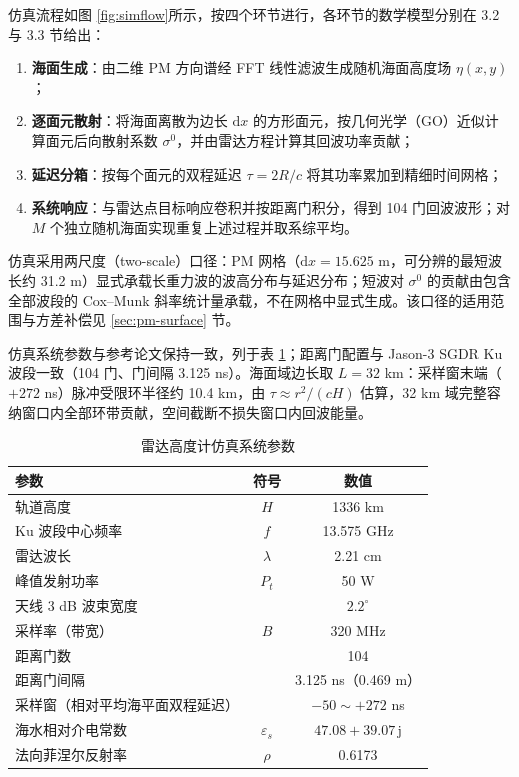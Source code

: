 \documentclass[a4paper]{article}
\newcommand{\song}{\CJKfamily{song}}
\newcommand{\wuhao}{\fontsize{10.5pt}{18pt}\selectfont}
\newcommand{\reffig}[1]{图 \ref{#1}}
\newcommand{\reftab}[1]{表 \ref{#1}}
\begin{document}
仿真流程如\reffig{fig:simflow}所示，按四个环节进行，各环节的数学模型分别在 3.2 与 3.3 节给出：
\begin{enumerate}
	\item \textbf{海面生成}：由二维 PM 方向谱经 FFT 线性滤波生成随机海面高度场 $\eta(x, y)$；
	\item \textbf{逐面元散射}：将海面离散为边长 $\mathrm{d}x$ 的方形面元，按几何光学（GO）近似计算面元后向散射系数 $\sigma^0$，并由雷达方程计算其回波功率贡献；
	\item \textbf{延迟分箱}：按每个面元的双程延迟 $\tau = 2R/c$ 将其功率累加到精细时间网格；
	\item \textbf{系统响应}：与雷达点目标响应卷积并按距离门积分，得到 104 门回波波形；对 $M$ 个独立随机海面实现重复上述过程并取系综平均。
\end{enumerate}

仿真采用两尺度（two-scale）口径：PM 网格（$\mathrm{d}x = 15.625$ m，可分辨的最短波长约 31.2 m）显式承载长重力波的波高分布与延迟分布；短波对 $\sigma^0$ 的贡献由包含全部波段的 Cox--Munk 斜率统计量承载，不在网格中显式生成。该口径的适用范围与方差补偿见 \ref{sec:pm-surface} 节。

仿真系统参数与参考论文\cite{refpaper}保持一致，列于\reftab{tab:params}；距离门配置与 Jason-3 SGDR Ku 波段一致（104 门、门间隔 3.125 ns）。海面域边长取 $L = 32$ km：采样窗末端（$+272$ ns）脉冲受限环半径约 10.4 km，由 $\tau \approx r^{2}/(cH)$ 估算，32 km 域完整容纳窗口内全部环带贡献，空间截断不损失窗口内回波能量。

\begin{table}[htpb]
	\centering
	\caption{雷达高度计仿真系统参数}
	\label{tab:params}
	\song\wuhao
	\begin{tabular}{lcc}
		\toprule
		参数 & 符号 & 数值 \\
		\hline
		轨道高度 & $H$ & 1336 km \\
		Ku 波段中心频率 & $f$ & 13.575 GHz \\
		雷达波长 & $\lambda$ & 2.21 cm \\
		峰值发射功率 & $P_t$ & 50 W \\
		天线 3 dB 波束宽度 & & $2.2^\circ$ \\
		采样率（带宽） & $B$ & 320 MHz \\
		距离门数 & & 104 \\
		距离门间隔 & & 3.125 ns（0.469 m） \\
		采样窗（相对平均海平面双程延迟） & & $-50 \sim +272$ ns \\
		海水相对介电常数 & $\varepsilon_s$ & $47.08 + 39.07\,\mathrm{j}$ \\
		法向菲涅尔反射率 & $\rho$ & 0.6173 \\
		\bottomrule
	\end{tabular}
\end{table}
\end{document}
